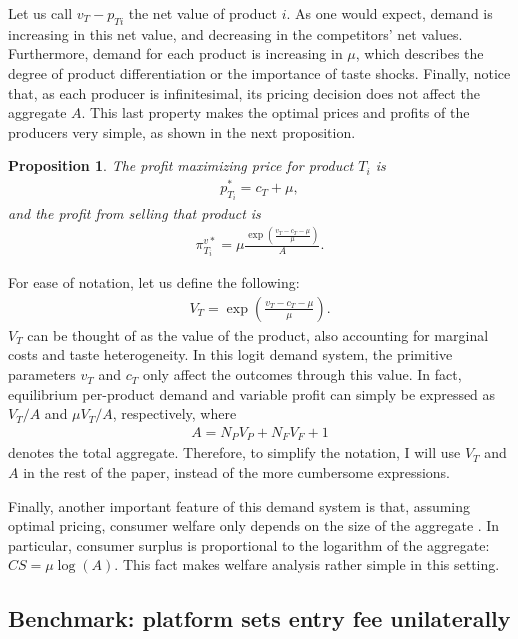 \documentclass[a4paper]{article}
\newtheorem{proposition}{Proposition}
\begin{document}
Let us call $v_T - p_{Ti}$ the net value of product $i$.
As one would expect, demand is increasing in this net value, and decreasing in the competitors' net values.
Furthermore, demand for each product is increasing in $\mu$, which describes the degree of product differentiation or the importance of taste shocks.
Finally, notice that, as each producer is infinitesimal, its pricing decision does not affect the aggregate $A$.
This last property makes the optimal prices and profits of the producers very simple, as shown in the next proposition.
\begin{proposition}
    \label{prop:optimal_profit}
    The profit maximizing price for product $T_i$ is
    \begin{align*}
        p^*_{T_i} = c_T + \mu,
    \end{align*}
    and the profit from selling that product is
    \begin{align}
        \pi^{v*}_{T_i} = \mu \frac{\exp \left( \frac{v_T - c_T - \mu}{\mu} \right)}{A}.
        \label{eq:optimal_profit}
    \end{align}
\end{proposition}

For ease of notation, let us define the following:
\begin{align*}
    V_T = \exp \left( \frac{v_T - c_T - \mu}{\mu} \right).
\end{align*}
$V_T$ can be thought of as the value of the product, also accounting for marginal costs and taste heterogeneity.
In this logit demand system, the primitive parameters $v_T$ and $c_T$ only affect the outcomes through this value.
In fact, equilibrium per-product demand and variable profit can simply be expressed as $V_T/ A$ and $\mu V_T/ A$, respectively, where
\begin{align*}
    A = N_P V_P + N_F V_F + 1
\end{align*}
denotes the total aggregate.
Therefore, to simplify the notation, I will use $V_T$ and $A$ in the rest of the paper, instead of the more cumbersome expressions.

Finally, another important feature of this demand system is that, assuming optimal pricing, consumer welfare only depends on the size of the aggregate \parencite{anderson2020aggregative}.
In particular, consumer surplus is proportional to the logarithm of the aggregate: $CS = \mu \log(A)$. This fact makes welfare analysis rather simple in this setting.

\subsection{Benchmark: platform sets entry fee unilaterally}
\end{document}
